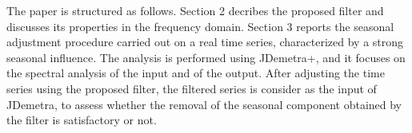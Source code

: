\documentclass{article}
\begin{document}
The paper is structured as follows. Section 2 decribes the proposed filter and discusses its properties in the frequency domain. Section 3 reports the seasonal adjustment procedure carried out on a real time series, characterized by a strong seasonal influence. The analysis is performed using JDemetra+, and it focuses on the spectral analysis of the input and  of the output. After adjusting the time series using the proposed filter, the filtered series is consider as the input of JDemetra,  to assess whether the removal of the seasonal component obtained by the filter is satisfactory or not.\\
\end{document}

